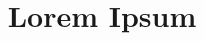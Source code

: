 \documentclass{vb}
\title{Lorem Ipsum}
\begin{document}
\thispagestyle{empty}
\maketitle
\begin{abstract}
  \lipsum[1]
\end{abstract}
\begin{multicols}{2}
  \lipsum[1-5]
\end{multicols}
\end{document}
